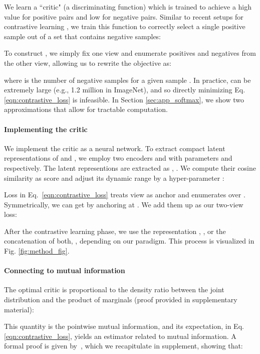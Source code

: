 \documentclass[10pt,twocolumn,letterpaper]{article}
\newcommand{\citep}[1]{\cite{#1}}
\begin{document}
We learn a ``critic" (a discriminating function)  which is trained to achieve a high value for positive pairs and low for negative pairs. Similar to recent setups for contrastive learning \citep{oord2018representation,gutmann2010noise,mnih2013learning}, we train this function to correctly select a single positive sample  out of a set  that contains  negative samples:

To construct , we simply fix one view and enumerate positives and negatives from the other view, allowing us to rewrite the objective as:

where  is the number of negative samples  for a given sample . In practice,  can be extremely large (e.g., 1.2 million in ImageNet), and so directly minimizing Eq. \ref{eqn:contrastive_loss} is infeasible. In Section \ref{sec:app_softmax}, we show two approximations that allow for tractable computation.

\paragraph{Implementing the critic}
We implement the critic  as a neural network. To extract compact latent representations of  and , we employ two encoders  and  with parameters  and  respectively. The latent representions are extracted as , . We compute their cosine similarity as score and adjust its dynamic range by a hyper-parameter :


Loss  in Eq.~\ref{eqn:contrastive_loss} treats view  as anchor and enumerates over . Symmetrically, we can get  by anchoring at . We add them up as our two-view loss:

After the contrastive learning phase, we use the representation , , or the concatenation of both, , depending on our paradigm. This process is visualized in Fig. \ref{fig:method_fig}.

\paragraph{Connecting to mutual information}
The optimal critic  is proportional to the density ratio between the joint distribution  and the product of marginals  (proof provided in supplementary material):

This quantity is the pointwise mutual information, and its expectation, in Eq. \ref{eqn:contrastive_loss}, yields an estimator related to mutual information. A formal proof is given by~\cite{oord2018representation,poole2019variational}, which we recapitulate in supplement, showing that:
\end{document}
